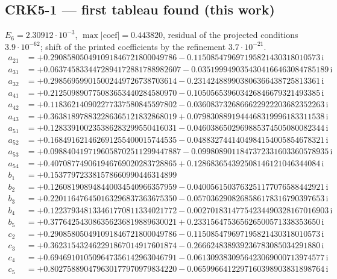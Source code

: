 \subsection*{CRK5-1 --- first tableau found (this work)}
$E_{6}=2.30912\cdot10^{-3}$, $\max|\text{coef}|=0.443820$, residual of the projected conditions $3.9\cdot10^{-62}$; shift of the printed coefficients by the refinement $3.7\cdot10^{-21}$. 
{\small
\begin{align*}
a_{21} &= +0.290858050491091846721800049786 - 0.115085479697195821430318010573\,\mathrm{i}\\
a_{31} &= +0.0637458334472894172881788982607 - 0.0351999490354304166463084785189\,\mathrm{i}\\
a_{32} &= +0.298569599015002449726738703614 - 0.231424889903806366438725813361\,\mathrm{i}\\
a_{41} &= +0.212509890775083653440284580970 - 0.105056539603426846679321493385\,\mathrm{i}\\
a_{42} &= +0.118362140902277337580845597802 - 0.0360837326866622922203682352263\,\mathrm{i}\\
a_{43} &= +0.363818978832286365121832868019 + 0.0798308891944468319996183311538\,\mathrm{i}\\
a_{51} &= +0.128339100235386283299550416031 - 0.0460386502969885374505080082344\,\mathrm{i}\\
a_{52} &= +0.168491621462691255400015744535 - 0.0488327441404984154005854678321\,\mathrm{i}\\
a_{53} &= +0.0988404197196058702511299447887 - 0.0998089011847372331603360578935\,\mathrm{i}\\
a_{54} &= +0.407087749061946769020283728865 + 0.128683654392508146121046344084\,\mathrm{i}\\[1mm]
b_{1} &= +0.153779723381578660990446314899\\
b_{2} &= +0.126081908948440034540966357959 - 0.0400561503763251177076588442921\,\mathrm{i}\\
b_{3} &= +0.220116476450163296837363675350 - 0.0570362908268586178316790397653\,\mathrm{i}\\
b_{4} &= +0.122379348133461770811334021772 - 0.00270183147754234490328167016903\,\mathrm{i}\\
b_{5} &= +0.377642543086356236819889630021 + 0.233156475365626500571338353650\,\mathrm{i}\\[1mm]
c_{2} &= +0.290858050491091846721800049786 - 0.115085479697195821430318010573\,\mathrm{i}\\
c_{3} &= +0.362315432462291867014917601874 - 0.266624838939236783085034291880\,\mathrm{i}\\
c_{4} &= +0.694691010509647356142963046791 - 0.0613093830956423069000713974577\,\mathrm{i}\\
c_{5} &= +0.802758890479630177970979834220 - 0.0659966412297160398903831898764\,\mathrm{i}
\end{align*}
}

